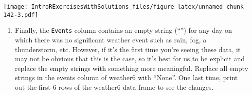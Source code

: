 \documentclass[]{article}
\newenvironment{Shaded}{\begin{snugshade}}{\end{snugshade}}
\newcommand{\KeywordTok}[1]{\textcolor[rgb]{0.13,0.29,0.53}{\textbf{#1}}}
\newcommand{\StringTok}[1]{\textcolor[rgb]{0.31,0.60,0.02}{#1}}
\newcommand{\CommentTok}[1]{\textcolor[rgb]{0.56,0.35,0.01}{\textit{#1}}}
\newcommand{\OperatorTok}[1]{\textcolor[rgb]{0.81,0.36,0.00}{\textbf{#1}}}
\newcommand{\NormalTok}[1]{#1}
\providecommand{\tightlist}{%
  \setlength{\itemsep}{0pt}\setlength{\parskip}{0pt}}
\begin{document}
\texttt{[image: IntroRExercisesWithSolutions\_files/figure-latex/unnamed-chunk-142-3.pdf]}

\begin{enumerate}
\def\labelenumi{\arabic{enumi}.}
\setcounter{enumi}{11}
\tightlist
\item
  Finally, the \texttt{Events} column contains an empty string (``'')
  for any day on which there was no significant weather event such as
  rain, fog, a thunderstorm, etc. However, if it's the first time you're
  seeing these data, it may not be obvious that this is the case, so
  it's best for us to be explicit and replace the empty strings with
  something more meaningful. Replace all empty strings in the events
  column of weather6 with ``None''. One last time, print out the first 6
  rows of the weather6 data frame to see the changes.
\end{enumerate}

\begin{Shaded}
\end{Shaded}
\end{document}
